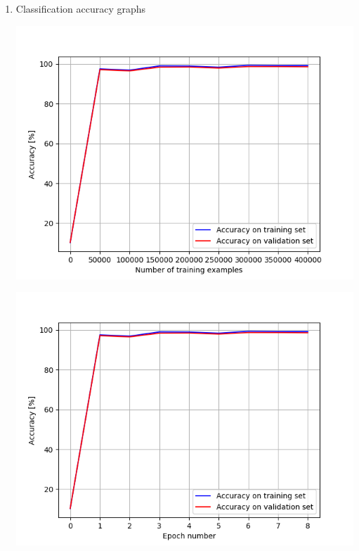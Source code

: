 \documentclass[a4paper]{iacas}
\begin{document}
\begin{enumerate}
\item Classification accuracy graphs

\vskip 0.1in
\begin{minipage}{\linewidth}
	\includegraphics[scale=0.8]{hw2_py/results/_14_01_43/lr_0_01_net_1_CE_/accuracy.png}
	\label{fig_3}
\end{minipage}
\vskip 0.1in
\begin{minipage}{\linewidth}
	\includegraphics[scale=0.8]{hw2_py/results/_14_01_43/lr_0_01_net_1_CE_/accuracy_epoch.png}
	\label{fig_4}
\end{minipage}
\vskip 0.1in
\end{enumerate}
\end{document}
